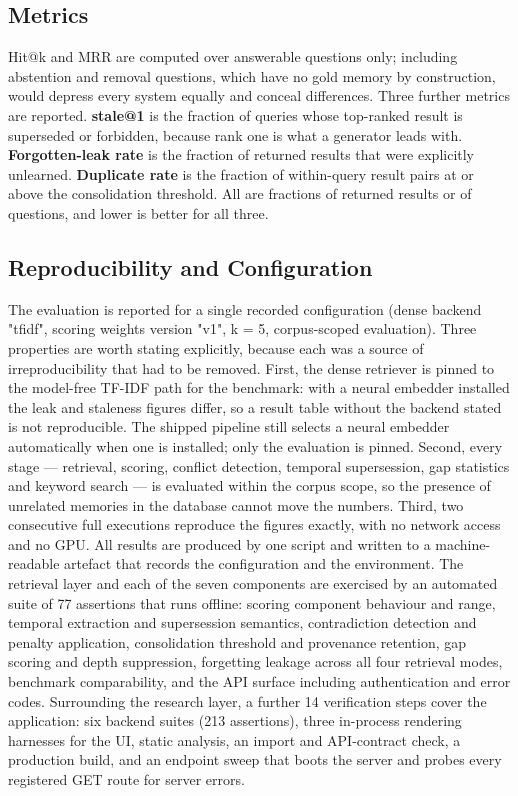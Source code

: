 \documentclass[conference]{IEEEtran}
\begin{document}
\subsection{Metrics}
Hit@k and MRR are computed over answerable questions only; including abstention and removal questions, which have no gold memory by construction, would depress every system equally and conceal differences. Three further metrics are reported. \textbf{stale@1} is the fraction of queries whose top-ranked result is superseded or forbidden, because rank one is what a generator leads with. \textbf{Forgotten-leak rate} is the fraction of returned results that were explicitly unlearned. \textbf{Duplicate rate} is the fraction of within-query result pairs at or above the consolidation threshold. All are fractions of returned results or of questions, and lower is better for all three.
\subsection{Reproducibility and Configuration}
The evaluation is reported for a single recorded configuration (dense backend "tfidf", scoring weights version "v1", k = 5, corpus-scoped evaluation). Three properties are worth stating explicitly, because each was a source of irreproducibility that had to be removed. First, the dense retriever is pinned to the model-free TF-IDF path for the benchmark: with a neural embedder installed the leak and staleness figures differ, so a result table without the backend stated is not reproducible. The shipped pipeline still selects a neural embedder automatically when one is installed; only the evaluation is pinned. Second, every stage --- retrieval, scoring, conflict detection, temporal supersession, gap statistics and keyword search --- is evaluated within the corpus scope, so the presence of unrelated memories in the database cannot move the numbers. Third, two consecutive full executions reproduce the figures exactly, with no network access and no GPU. All results are produced by one script and written to a machine-readable artefact that records the configuration and the environment.
The retrieval layer and each of the seven components are exercised by an automated suite of 77 assertions that runs offline: scoring component behaviour and range, temporal extraction and supersession semantics, contradiction detection and penalty application, consolidation threshold and provenance retention, gap scoring and depth suppression, forgetting leakage across all four retrieval modes, benchmark comparability, and the API surface including authentication and error codes. Surrounding the research layer, a further 14 verification steps cover the application: six backend suites (213 assertions), three in-process rendering harnesses for the UI, static analysis, an import and API-contract check, a production build, and an endpoint sweep that boots the server and probes every registered GET route for server errors.
\end{document}
